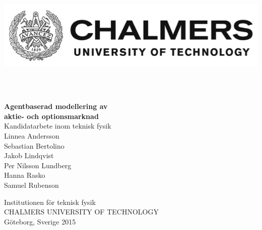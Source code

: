 \begin{titlepage}
\begin{flushleft}
\begin{minipage}{0.8\textwidth}
\includegraphics[width=\textwidth]{Chalmers.png}
\end{minipage}
\\[0.5cm]
\HRule \\[7.0cm]

\end{flushleft}
\noindent
\textbf{{\Huge Agentbaserad modellering av \\
aktie- och optionsmarknad}}
\\[0.3cm]
{\large Kandidatarbete inom teknisk fysik}
\\[1.0cm]
Linnea Andersson \\
Sebastian Bertolino \\
Jakob Lindqvist \\
Per Nilsson Lundberg \\
Hanna Rasko \\
Samuel Rubenson \\[1.0cm]
\noindent
\HRule

\noindent
Institutionen för teknisk fysik \\
CHALMERS UNIVERSITY OF TECHNOLOGY \\
Göteborg, Sverige 2015
\end{titlepage}